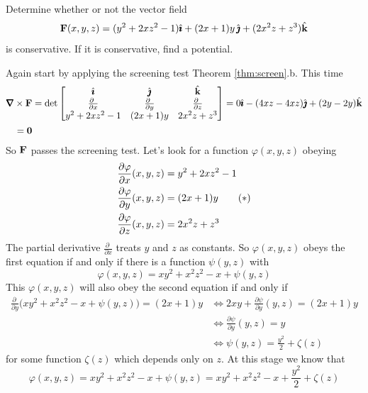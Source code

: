 \begin{eg}\label{eg:potentialD}
Determine whether or not the vector field
\begin{equation*}
\mathbf{F}(x,y,z) = (y^2+2xz^2-1)\hat{\pmb{\imath}} +(2x+1)y\,\hat{\pmb{\jmath}} +(2x^2z+z^3)\hat{\mathbf{k}}
\end{equation*}
is conservative. If it is conservative, find a potential.

\soln
Again start by applying the screening test Theorem \ref{thm:screen}.b.
This time
\begin{align*}
\vnabla\times\vF
&=\det\left[\begin{matrix}
                \hi &\hj & \hk \\
                \frac{\partial\ }{\partial x} & \frac{\partial\ }{\partial y}
                      & \frac{\partial\ }{\partial z} \\
                y^2+2xz^2-1 & (2x+1)y & 2x^2z+z^3
            \end{matrix}\right]
=0\hi-(4xz-4xz)\hj+(2y-2y)\hk \\
=\vZero
\end{align*}
So $\mathbf{F}$ passes the screening test. Let's look for a function 
$\varphi(x,y,z)$ obeying
\begin{align}
\frac{\partial \varphi}{\partial x}(x,y,z) &= y^2+2xz^2-1 \notag\\
\frac{\partial \varphi}{\partial y}(x,y,z) &= (2x+1)y \tag{$*$}\\
\frac{\partial \varphi}{\partial z}(x,y,z) &= 2x^2z+z^3 \notag
\end{align}
The partial derivative $\frac{\partial \ }{\partial x}$ treats $y$
and $z$ as constants. So $\varphi(x,y,z)$ obeys the first equation
if and only if there is a function $\psi(y,z)$ with
\begin{equation*}
\varphi(x,y,z)
=xy^2+x^2z^2-x
+\psi(y,z)
\end{equation*}
This $\varphi(x,y,z)$ will also obey the second equation if and only if 
\begin{align*}
\frac{\partial \ }{\partial y}\big(xy^2+x^2z^2-x+\psi(y,z)\big) = (2x+1)y
&\iff 2xy +\frac{\partial\psi}{\partial y}(y,z) = (2x+1)y \\
&\iff \frac{\partial\psi}{\partial y}(y,z) = y \\
&\iff \psi(y,z) = \frac{y^2}{2} +\zeta(z)
\end{align*}
for some function $\zeta(z)$ which depends only on $z$. At this stage
we know that 
\begin{equation*}
\varphi(x,y,z)
=xy^2+x^2z^2-x+\psi(y,z)
=xy^2+x^2z^2-x+\frac{y^2}{2}+\zeta(z)

\end{equation*}
\end{eg}
